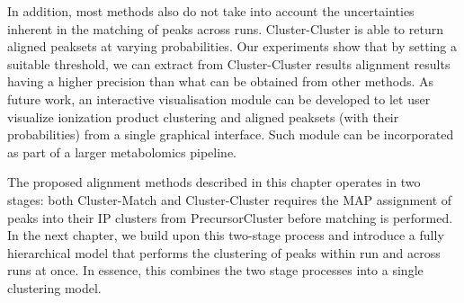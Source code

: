 In addition, most methods also do not take into account the uncertainties inherent in the matching of peaks across runs. Cluster-Cluster is able to return aligned peaksets at varying probabilities. Our experiments show that by setting a suitable threshold, we can extract from Cluster-Cluster results alignment results having a higher precision than what can be obtained from other methods. As future work, an interactive visualisation module can be developed to let user visualize ionization product clustering and aligned peaksets (with their probabilities) from a single graphical interface. Such module can be incorporated as part of a larger metabolomics pipeline.

The proposed alignment methods described in this chapter operates in two stages: both Cluster-Match and Cluster-Cluster requires the MAP assignment of peaks into their IP clusters from PrecursorCluster before matching is performed. In the next chapter, we build upon this two-stage process and introduce a fully hierarchical model that performs the clustering of peaks within run and across runs at once. In essence, this combines the two stage processes into a single clustering model.